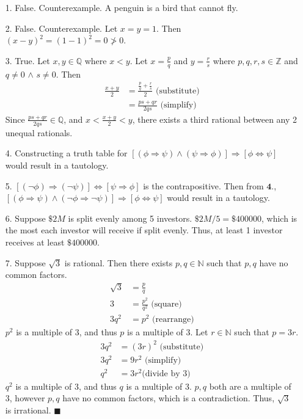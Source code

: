 \documentclass[11pt]{exam}
\author{@dante}
\begin{document}

\begin{enumerate}[leftmargin=0pt]

\item[1.] False. Counterexample. A penguin is a bird that cannot fly.

\item[2.] False. Counterexample. Let $x = y = 1$. Then $(x - y)^2 = (1 - 1)^2 = 0 \not > 0$.

\item[3.] True. Let $x, y \in \mathbb{Q}$ where $x < y$. Let $x = \frac{p}{q}$ and $y = \frac{r}{s}$ where $p, q, r, s \in \mathbb{Z}$ and $q \not = 0$ $\land$ $s \not = 0$. Then
\begin{align*}
    \frac{x + y}{2} &= \frac{\frac{p}{q} + \frac{r}{s}}{2} \text{ (substitute)} \\
    &= \frac{ps + qr}{2qs} \text{ (simplify)}
\end{align*}
Since $\frac{ps + qr}{2qs} \in \mathbb{Q}$, and $x < \frac{x + y}{2} < y$, there exists a third rational between any 2 unequal rationals.

\item[4.] Constructing a truth table for $[(\phi \Rightarrow \psi) \land (\psi \Rightarrow \phi)] \Rightarrow [\phi \Leftrightarrow \psi]$ would result in a tautology.

\item[5.] $[(\neg \phi) \Rightarrow (\neg \psi)] \Leftrightarrow [\psi \Rightarrow \phi]$ is the contrapositive. Then from $\textbf{4.}$, $[(\phi \Rightarrow \psi) \land (\neg \phi \Rightarrow \neg \psi)] \Rightarrow [\phi \Leftrightarrow \psi]$ would result in a tautology.

\item[6.] Suppose $\$2M$ is split evenly among 5 investors. $\$2M / 5 = \$400000$, which is the most each investor will receive if split evenly. Thus, at least 1 investor receives at least $\$400000$.

\item[7.] Suppose $\sqrt{3}$ is rational. Then there exists $p, q \in \mathbb{N}$ such that $p, q$ have no common factors.
\begin{align*}
    \sqrt{3} &= \frac{p}{q} \\
    3 &= \frac{p^2}{q^2} \text{     (square)}\\
    3q^2 &= p^2 \text{     (rearrange)}
\end{align*}
$p^2$ is a multiple of 3, and thus $p$ is a multiple of 3. Let $r \in \mathbb{N}$ such that $p = 3r$.
\begin{align*}
    3q^2 &= (3r)^2 \text{ 
        (substitute)}\\
    3q^2 &= 9r^2 \text{  
        (simplify)}\\
    q^2 &= 3r^2 \text{
        (divide by 3)}
\end{align*}
$q^2$ is a multiple of 3, and thus $q$ is a multiple of 3. $p, q$ both are a multiple of 3, however $p, q$ have no common factors, which is a contradiction. Thus, $\sqrt{3}$ is irrational. $\blacksquare$


\end{enumerate}
\end{document}
